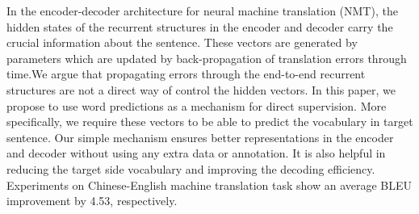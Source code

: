 In the encoder-decoder architecture for neural machine translation (NMT), the hidden states of the recurrent structures in the encoder and decoder carry the crucial information about the sentence. These vectors are generated by parameters which are updated by back-propagation of translation errors through time.We argue that propagating errors through the end-to-end recurrent structures are not a direct way of control the hidden vectors. In this paper, we propose to use word predictions as a mechanism for direct supervision. More specifically, we require these vectors to be able to predict the vocabulary in target sentence. Our simple mechanism ensures better representations in the encoder and decoder without using any extra data or annotation. It is also helpful in reducing the target side vocabulary and improving the decoding efficiency. Experiments on Chinese-English machine translation task show an average BLEU improvement by 4.53, respectively.
